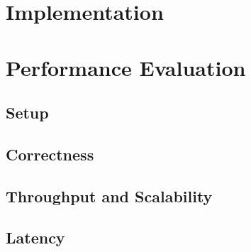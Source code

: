\documentclass[sigconf,nonacm]{acmart}
\begin{document}
\section{Implementation}

\section{Performance Evaluation}
\subsection{Setup}

\subsection{Correctness}

\subsection{Throughput and Scalability}

\subsection{Latency}
\end{document}
